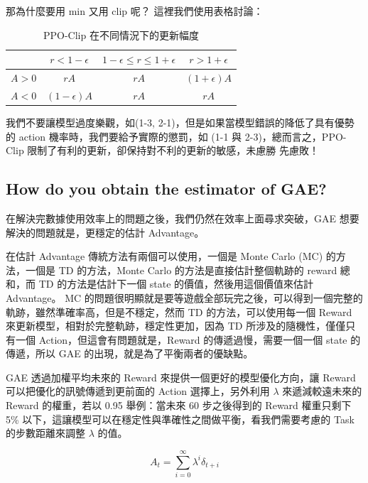 那為什麼要用 min 又用 clip 呢？ 這裡我們使用表格討論：

\begin{table}[h]
    \centering
    \begin{tabular}{|c|c|c|c|}
        \hline
        & $r < 1-\epsilon$ & $1-\epsilon \leq r \leq 1+\epsilon$ & $r > 1+\epsilon$ \\
        \hline
        $A > 0$ & $rA$ & $rA$ & $(1+\epsilon)A$ \\
        \hline
        $A < 0$ & $(1-\epsilon)A$ & $rA$ & $rA$ \\
        \hline
    \end{tabular}
    \caption{PPO-Clip 在不同情況下的更新幅度}
    \label{tab:ppo_clip}
\end{table}

我們不要讓模型過度樂觀，如(1-3, 2-1)，但是如果當模型錯誤的降低了具有優勢的 action 機率時，我們要給予實際的懲罰，如 (1-1 與 2-3)，總而言之，PPO-Clip 限制了有利的更新，卻保持對不利的更新的敏感，未慮勝 先慮敗！


\subsection{How do you obtain the estimator of GAE?}

在解決完數據使用效率上的問題之後，我們仍然在效率上面尋求突破，GAE 想要解決的問題就是，更穩定的估計 Advantage。

在估計 Advantage 傳統方法有兩個可以使用，一個是 Monte Carlo (MC) 的方法，一個是 TD 的方法，Monte Carlo 的方法是直接估計整個軌跡的 reward 總和，而 TD 的方法是估計下一個 state 的價值，然後用這個價值來估計 Advantage。 MC 的問題很明顯就是要等遊戲全部玩完之後，可以得到一個完整的軌跡，雖然準確率高，但是不穩定，然而 TD 的方法，可以使用每一個 Reward 來更新模型，相對於完整軌跡，穩定性更加，因為 TD 所涉及的隨機性，僅僅只有一個 Action，但這會有問題就是，Reward 的傳遞過慢，需要一個一個 state 的傳遞，所以 GAE 的出現，就是為了平衡兩者的優缺點。

GAE 透過加權平均未來的 Reward 來提供一個更好的模型優化方向，讓 Reward 可以把優化的訊號傳遞到更前面的 Action 選擇上，另外利用 $\lambda$ 來遞減較遠未來的 Reward 的權重，若以 0.95 舉例：當未來 60 步之後得到的 Reward 權重只剩下 5\% 以下，這讓模型可以在穩定性與準確性之間做平衡，看我們需要考慮的 Task 的步數距離來調整 $\lambda$ 的值。

\begin{equation}
    A_t = \sum_{i=0}^{\infty} \lambda^{i} \delta_{t+i}
\end{equation}

